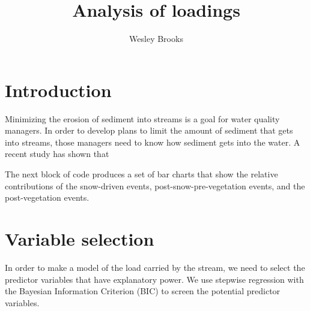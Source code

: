 \documentclass[12pt]{article}
\title{Analysis of loadings}
\author{Wesley Brooks}
\date{}                                           %
\begin{document}
\maketitle


\section{Introduction}
Minimizing the erosion of sediment into streams is a goal for water quality managers. In order to develop plans to limit the amount of sediment that gets into streams, those managers need to know how sediment gets into the water. A recent study \cite{Danz:2010} has shown that 

The next block of code produces a set of bar charts that show the relative contributions of the snow-driven events, post-snow-pre-vegetation events, and the post-vegetation events.\\





\section{Variable selection}
In order to make a model of the load carried by the stream, we need to select the predictor variables that have explanatory power. We use stepwise regression with the Bayesian Information Criterion (BIC) to screen the potential predictor variables. 
\end{document}
